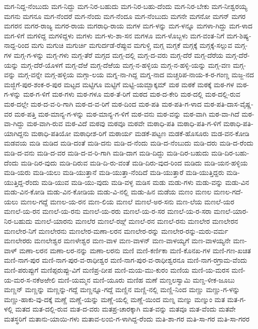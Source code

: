 ಮಗ-ನಿದ್ದ-ನೆಂಬುದು
ಮಗ-ನಿದ್ದು
ಮಗ-ನಿರ-ಬಹುದು
ಮಗ-ನಿರ-ಬಹು-ದೆಂದು
ಮಗ-ನಿರ-ಬೇಕು
ಮಗ-ನೀಶ್ವರಯ್ಯ
ಮಗನು
ಮಗನೂ
ಮಗ-ನೆಂದರೆ
ಮಗ-ನೆಂದು
ಮಗ-ನೆಂದೂ
ಮಗ-ನೆಂಬುದು
ಮಗನೇ
ಮಗನೋ
ಮಗನ್
ಮಗರ
ಮಗರನ
ಮಗರ-ರಾಜ್ಯ
ಮಗರ-ರಾಯ
ಮಗರಾಧಿ-ರಾಯ
ಮಗಳ
ಮಗ-ಳನ್ನು
ಮಗ-ಳನ್ನೂ
ಮಗಳಾ-ಗಿದ್ದು
ಮಗ-ಳಾದ
ಮಗ-ಳಿಗೆ
ಮಗಳಿದ್ದ
ಮಗಳಿದ್ದಳು
ಮಗಳು
ಮಗ-ಳು-ಶಾ-ಸನ
ಮಗಳೂ
ಮಗ-ಳೊಬ್ಬಳು
ಮಗ-ವಂತ-ನಿಗೆ
ಮಗ-ಶಿಷ್ಯ-ನಾದ್ದ-ರಿಂದ
ಮಗು
ಮಗುಚಿ
ಮಗುರ್ಚಿ
ಮಗುರ್ದಡೆ-ರೆಪ್ಪುವ
ಮಗುಳ್ಚಿ
ಮಗ್ಗ
ಮಗ್ಗಕೆ
ಮಗ್ಗಕ್ಕೆ
ಮಗ್ಗಕ್ಕೆ-ಸಲ್ಲುವ
ಮಗ್ಗ-ಗಳ
ಮಗ್ಗ-ಗ-ಳನ್ನು
ಮಗ್ಗ-ಗಳು
ಮಗ್ಗ-ತೆರೆ
ಮಗ್ಗದ
ಮಗ್ಗ-ದಲ್ಲಿ
ಮಗ್ಗ-ದ-ವರು
ಮಗ್ಗ-ದೆರೆ
ಮಗ್ಗ-ದೆರೆಯ
ಮಗ್ಗ-ದೆರೆ-ಯನ್ನು
ಮಗ್ಗ-ದೆರೆ-ಯೊಳಗೆ
ಮಗ್ಗ-ದೆಱೆ
ಮಗ್ಗ-ದೆಱೆಯ
ಮಗ್ಗ-ನ-ಹಳ್ಳಿಯ
ಮಗ್ಗ-ನ-ಹಳ್ಳಿ-ಯನ್ನು
ಮಗ್ಗ-ವಣ
ಮಗ್ಗ-ವನ್ನು
ಮಗ್ಗ-ವನ್ನೇ
ಮಗ್ಗ-ಹಳ್ಳಿಯ
ಮಗ್ಗಾ-ಲಯ
ಮಗ್ನ-ನಾ-ಗಿದ್ದ
ಮಗ್ನ-ನಾದ
ಮಚ್ಚರಿಪ-ನಾಯ-ಕ-ರ-ಗಂಣ್ಡ
ಮಜ್ಜ-ನದ
ಮಜ್ಜಿಗೆ-ಪುರ-ಶಂಕ-ರ-ಪುರ
ಮಟ್ಟದ
ಮಟ್ಟಿಗೂ
ಮಟ್ಟಿಗೆ
ಮಟ್ಟಿ-ಯಮ್ಬಾಕ್ಕಮ್
ಮಠ
ಮಠಕೆ
ಮಠಕ್ಕೆ
ಮಠ-ಗಳ
ಮಠ-ಗ-ಳನ್ನು
ಮಠ-ಗ-ಳಿಗೆ
ಮಠ-ಗಳು
ಮಠ-ಗಳೂ
ಮಠ-ತೆ-ರಿಗೆ
ಮಠದ
ಮಠ-ದ-ಕೇರಿ
ಮಠ-ದಲ್ಲಿ
ಮಠ-ದಲ್ಲಿ-ರುವ
ಮಠ-ದಲ್ಲೇ
ಮಠ-ದ-ವ-ರಿ-ಗಾಗಿ
ಮಠ-ದ-ವ-ರಿಗೆ
ಮಠ-ದಿಂದ
ಮಠ-ಪತಿ
ಮಠ-ಪತಿ-ಗ-ಳಾದ
ಮಠ-ಪತಿ-ದಾಸ-ವೈಷ್ಣ-ವರ
ಮಠ-ಪತ್ತಿ
ಮಠ-ಮಾನ್ಯ-ಗ-ಳನ್ನು
ಮಠ-ಮಾನ್ಯ-ಗ-ಳಿಗೆ
ಮಠ-ವನು
ಮಠ-ವನ್ನು
ಮಠ-ವಾಗಿ
ಮಠ-ವಾ-ಗಿದೆ
ಮಠ-ವಾ-ಗಿದ್ದು
ಮಠ-ವಾಗಿ-ರುವ
ಮಠ-ವಿದೆ
ಮಠವು
ಮಠವೂ
ಮಠವೇ
ಮಠಾಧಿ-ಪತಿ
ಮಠಾಧಿ-ಪತಿ-ಗ-ಳಿಗೆ
ಮಠಾಧಿ-ಪತಿ-ಯಾಗಿದ್ದನು
ಮಠಾಧಿ-ಪತಿಯೋ
ಮಠಾಧೀಶ-ರಿಗೆ
ಮಠಾರ್ಯ
ಮಡಕೆ-ಪಟ್ಟಣ
ಮಡಕೆ-ಹೊಸೂರು
ಮಡ-ವನ-ಕೋಡಿ
ಮಡವಯ
ಮಡಿ
ಮಡಿದ
ಮಡಿ-ದಂತೆ
ಮಡಿ-ದನು
ಮಡಿ-ದ-ನೆಂದು
ಮಡಿ-ದ-ನೆಂಬುದು
ಮಡಿ-ದರು
ಮಡಿ-ದ-ರೆಂದು
ಮಡಿ-ದ-ವನು
ಮಡಿ-ದ-ವರ
ಮಡಿ-ದ-ವ-ರಿ-ಗಾಗಿ
ಮಡಿ-ದಾಗ
ಮಡಿ-ದಿದ್ದು
ಮಡಿ-ದಿರ-ಬಹುದು
ಮಡಿ-ದಿರ-ಬಹು-ದೆಂದು
ಮಡಿ-ದಿರ-ವುದು
ಮಡಿ-ದಿರುವ
ಮಡಿ-ದಿ-ರು-ವಂತೆ
ಮಡಿ-ದಿರು-ವುದ-ರಿಂದ
ಮಡಿದು
ಮಡಿ-ಯನ-ಹಳ್ಳಿಯ
ಮಡಿ-ಯರು
ಮಡಿ-ಯಲು
ಮಡಿ-ಯುತ್ತಾನೆ
ಮಡಿ-ಯುತ್ತಾ-ನೆಂದಿದೆ
ಮಡಿ-ಯುತ್ತಾರೆ
ಮಡಿ-ಯುತ್ತಿದ್ದರು
ಮಡಿ-ಯುತ್ತಿದ್ದ-ರೆಂದು
ಮಡಿ-ಯುವ
ಮಡಿ-ಯು-ವುದು
ಮಡಿ-ವಳ್ಳ
ಮಡಿಸ
ಮಡು
ಮಡು-ಗಳು
ಮಡು-ವನ್ನು
ಮಡು-ವಿನ
ಮಡು-ವಿನ-ಕೋಡಿ
ಮಡು-ವಿನ-ಕೋಡಿಯ
ಮಡು-ವಿ-ನಲ್ಲಿ
ಮಡು-ಹಿನ
ಮಡೆಯ
ಮಣಂ
ಮಣಲ
ಮಣಲ-ಗದೆ-ಯಲು
ಮಣಲ-ಗದ್ದೆ
ಮಣಲ-ಯ-ರನ
ಮಣ-ಲಿಯ
ಮಣಲೆ
ಮಣಲೆ-ಅರ-ಸನು
ಮಣ-ಲೆಯ
ಮಣಲೆ-ಯರ
ಮಣಲೆ-ಯ-ರನ
ಮಣಲೆ-ಯ-ರನು
ಮಣಲೆ-ಯ-ರರು
ಮಣಲೆ-ಯ-ರ-ಸರ
ಮಣಲೆ-ಯ-ರ-ಸರಾ
ಮಣಲೆ-ಯಾರ-ನಿರ-ಬಹುದು
ಮಣಲೆ-ಯಾರನು
ಮಣಲೆರ
ಮಣಲೆ-ರಙ್ಗೆ
ಮಣಲೆ-ರನ
ಮಣಲೆ-ರನು
ಮಣಲೇರ
ಮಣಲೇರನ
ಮಣಲೇರ-ನಿಗೆ
ಮಣಲೇರನು
ಮಣಲೇರ-ಮಣಾ-ಲರನ
ಮಣಲೇರ-ರನ್ನು
ಮಣಲೇರ-ರನ್ನು-ಮರು-ವರ್ಮ
ಮಣಲೇರರು
ಮಣಲೇಶ್ವರ
ಮಣಳೇಶ್ವರ
ಮಣ-ವಾಳ
ಮಣ-ವಾಳನ್
ಮಣ-ವಾಳಯ್ಯಗೆ
ಮಣ-ವಾಳಯ್ಯನೇ
ಮಣ-ವಾಳ್
ಮಣಾ-ಲರನ
ಮಣಾ-ಲರ-ನನ್ನು
ಮಣಾ-ಲರನು
ಮಣಿ
ಮಣಿ-ಕರ್ಣಿಕಾ
ಮಣಿ-ಕೊನಖ-ಗಳ
ಮಣಿ-ಗಣ-ಖಚಿತ
ಮಣಿ-ನಾಗ-ಪುರ
ಮಣಿ-ನಾಗ-ಪುರ-ವ-ರಾಧೀಶ್ವರ
ಮಣಿ-ನಾಗ-ಪುರ-ವ-ರಾಧೀಶ್ವರನೂ
ಮಣಿ-ನಾಗ-ರಗ್ರಾಮ-ವೆಂದು
ಮಣಿ-ಪರುಪ್ಪುಗೆ
ಮಣಿಪ್ಪರುಪ್ಪು-ವಿಗೆ
ಮಣಿಪ್ರ-ದೀಪ
ಮಣಿ-ಮಯ-ಮು-ಕುರಂ
ಮಣಿಯ
ಮಣಿ-ಯ-ಮರಸ
ಮಣಿ-ಯ-ಮರ-ಸ-ನಕೆಅಱೇಲಿ
ಮಣಿ-ಯಮ್ಮನ
ಮಣಿ-ಯೂರು
ಮಣಿಹ
ಮಣೆ
ಮಣ್ಡಲಸ್ವಾಮಿ
ಮಣ್ಡ-ಳೀಕ-ಜೂಬು
ಮಣ್ಣನ್
ಮಣ್ಣನ್ನು
ಮಣ್ಣನ್ನು-ಗದ್ದೆ
ಮಣ್ಣನ್ನೂ-ಗದ್ದೆ
ಮಣ್ಣಿನ
ಮಣ್ಣಿ-ನಲ್ಲಿ
ಮಣ್ಣಿ-ನಿಂದ
ಮಣ್ಣು
ಮಣ್ಣು-ಗ-ಳನ್ನು
ಮಣ್ಣು-ಹಾಕು-ವು-ದಕ್ಕೆ
ಮಣ್ಣೆ
ಮಣ್ಣೆ-ಯನ್ನು
ಮಣ್ಣೆ-ಯಲ್ಲಿ
ಮಣ್ಣೆ-ಯಿಂದ
ಮಣ್ನ
ಮಣ್ನು
ಮಣ್ನುಂ
ಮತ
ಮತ-ಗ-ಳಲ್ಲಿ
ಮತದ
ಮತ-ದಲ್ಲಿ-ರುವ
ಮತ-ದ-ವರು
ಮತಪ್ರ-ಚಾರಕ್ಕಾಗಿ
ಮತ-ವನ್ನು
ಮತವೂ
ಮತ-ವೆಂದು
ಮತವೇ
ಮತಸ್ಥರಿಗೆ
ಮತಾನು-ಯಾಯಿ-ಗಳು
ಮತಾವ-ಲಂಬಿ-ಗ-ಳಾಗಿದ್ದ-ರೆಂದು
ಮತಿ-ಶಾ-ಗರ
ಮತಿ-ಸಾ-ಗರ
ಮತಿ-ಸಾ-ಗರರ
